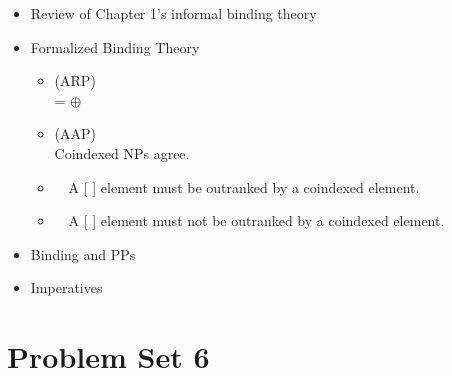 \documentclass[a4paper,landscape,headrule,footrule]{foils}
\begin{document}
\begin{itemize}\addtolength{\itemsep}{-2ex}
\item Review of Chapter 1's informal binding
theory
\item Formalized Binding Theory
  \begin{itemize}
  \item {} (ARP)
    \\   =   $\oplus$ 
  \item {} (AAP)
   \\ Coindexed NPs agree.
 \item {}\ \  A [ ] element must be
outranked by a coindexed element.
\item {}\ \  A [ ] element must not
be outranked by a coindexed element.
  \end{itemize}
\item Binding and PPs
\item Imperatives
\end{itemize}


\section[Problem Set 6: review exercise (semantic identity tables); possessives, imperative `subjects' (SWB 6.3, 6.4, 7.2)]{Problem Set 6}

\newcommand{\nd}[2]{{\setlength{\fboxsep}{1pt}\fcolorbox{#1}{white}{#2}}}
\newcommand{\matsem}{%
\scalebox{0.65}{\avm{[ mode & prop \\ index & $s_1$ \\
 restr & < [reln & {\bf the} \\ bv & $i$ ],
           [reln & {\bf cat} \\ inst & $i$ ],
           [reln & {\bf sleep} \\ sit & $s_1$ \\ sleeper & $i$ ],
           [reln & {\bf on} \\ sit & $s_2$ \\ located & $s_1$ \\ location & $j$ ],
           [reln & {\bf the} \\ bv & $j$ ],
           [reln & {\bf mat} \\ inst & $j$ ] > ]}}}
\newcommand{\mattree}{%
\scalebox{0.6}{\begin{forest}
cat
[{S} [{\avm{\1} NP$_i$} [{D$_i$} [{\eng{the}}]]
  [{Nom$_i$ \avm{[ spr & < \1 > ]}} [{\eng{cat}}]]]
[{VP \avm{[ spr & < \1 > ]}}
  [{\avm{\5} VP$_{s_1}$ \avm{[ spr & < \1 > ]}} [{\eng{slept}}]]
  [{PP$_{s_2}$ \avm{[ mod & < \5 > ]}} [{P$_{s_2}$ \avm{[ comps & < \6 > ]}} [{\eng{on}}]]
    [{\avm{\6} NP$_j$} [{D$_j$} [{\eng{the}}]] [{Nom$_j$} [{\eng{mat}}]]]]]]
\end{forest}}}
\end{document}

